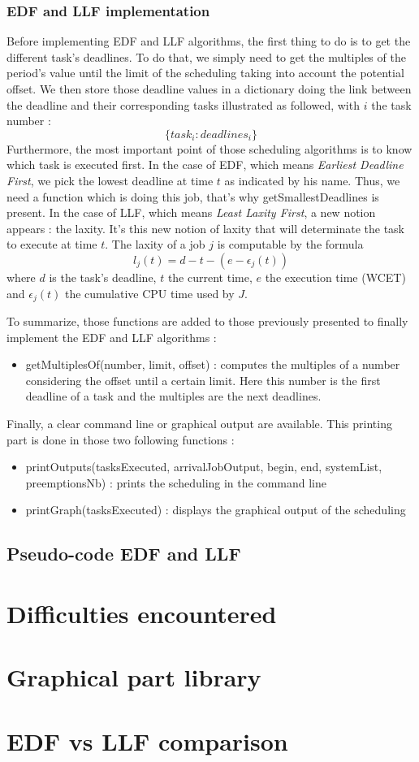 \documentclass{article}
\begin{document}
\subsubsection{EDF and LLF implementation}
Before implementing EDF and LLF algorithms, the first thing to do is to get the different task's deadlines. To do that, we simply need to get the multiples of the period's value until the limit of the scheduling taking into account the potential offset. We then store those deadline values in a dictionary doing the link between the deadline and their corresponding tasks illustrated as followed, with $i$ the task number :
$$ \{task_{i}:deadlines_{i}\} $$ 
Furthermore, the most important point of those scheduling algorithms is to know which task is executed first. In the case of EDF, which means \textit{Earliest Deadline First}, we pick the lowest deadline at time $t$ as indicated by his name. Thus, we need a function which is doing this job, that's why {\selectfont getSmallestDeadlines} is present. In the case of LLF, which means \textit{Least Laxity First}, a new notion appears : the laxity. It's this new notion of laxity that will determinate the task to execute at time $t$. The laxity of a job $j$ is computable by the formula $$ l_{j}(t) = d - t - ( e - \epsilon_{j}(t)) $$  where $d$ is the task's deadline, $t$ the current time, $e$ the execution time (WCET) and $\epsilon_{j}(t)$ the cumulative CPU time used by $J$.

To summarize, those functions are added to those previously presented to finally implement the EDF and LLF algorithms : 

\begin{itemize}
    \item {\selectfont getMultiplesOf(number, limit, offset)} :  computes the multiples of a number considering the offset until a certain limit. Here this number is the first deadline of a task and the multiples are the next deadlines. 
\end{itemize}

Finally, a clear command line or graphical output are available. This printing part is done in those two 
following functions : 

\begin{itemize}
    \item {\selectfont printOutputs(tasksExecuted, arrivalJobOutput, begin, end, systemList, preemptionsNb)} :  prints the scheduling in the command line 
    \item {\selectfont printGraph(tasksExecuted)} : displays the graphical output of the scheduling   
\end{itemize}

\subsection{Pseudo-code EDF and LLF}

\section{Difficulties encountered}

\section{Graphical part library}

\section{EDF vs LLF comparison}
\end{document}
